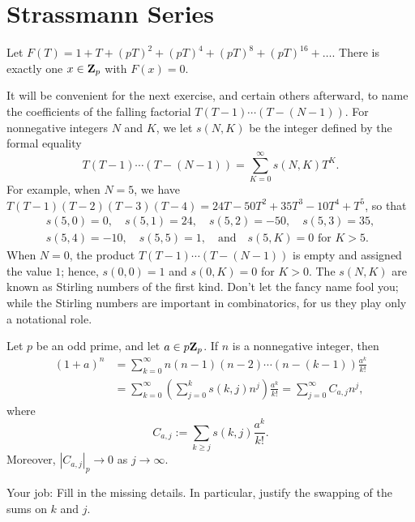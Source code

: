 \section*{Strassmann Series}

\begin{prob}\label{prob:uniquezero} Let $F(T) = 1 + T + (pT)^2 + (pT)^4 + (pT)^8 + (pT)^{16} + \dots$. There is exactly one $x\in \mathbf{Z}_p$ with $F(x)=0$.
\end{prob}

\vspace{-0.22in}
\testrule
It will be convenient for the next exercise, and certain others afterward, to name the coefficients of the \textsf{falling factorial} $T(T-1) \cdots (T-(N-1))$. For nonnegative integers $N$ and $K$, we let $s(N,K)$ be the integer defined by the formal equality \[ T(T-1)\cdots(T-(N-1)) = \sum_{K=0}^{\infty} s(N,K)  T^K.\]
For example, when $N=5$, we have $T(T-1)(T-2)(T-3)(T-4) = 24T - 50T^2 + 35T^3 - 10T^4 + T^5$, so that
\begin{multline*} s(5,0)=0, \quad s(5,1) = 24, \quad s(5,2) = -50, \quad s(5,3) = 35, \\ s(5,4)=-10, \quad s(5,5) = 1, \quad\text{and}\quad s(5,K) = 0 \text{ for $K > 5$}.\end{multline*}
When $N=0$, the product $T(T-1)\cdots (T-(N-1))$ is empty and assigned  the value $1$; hence, $s(0,0)=1$ and $s(0,K)=0$ for $K>0$. The $s(N,K)$ are known as \textsf{Stirling numbers of the first kind}.  Don't let the fancy name fool you; while the Stirling numbers are important in combinatorics, for us they play only a notational role.
\testruletwo

\begin{prob}\label{ex:binomialseries}\label{prob:binomialseries}
Let $p$ be an odd prime, and let $a \in p\mathbf{Z}_p$. If $n$ is a nonnegative integer, then 
\begin{align*} (1+a)^{n} &= \sum_{k=0}^{\infty} n(n-1)(n-2)\cdots(n-(k-1)) \frac{a^k}{k!} \\
&= \sum_{k=0}^{\infty} \left(\sum_{j=0}^{k} s(k,j)n^j\right)\frac{a^k}{k!} = \sum_{j=0}^{\infty} C_{a,j} n^j,\end{align*}
where
\[ C_{a,j} := \sum_{k\ge j} s(k,j) \frac{a^k}{k!}. \]
Moreover, $|C_{a,j}|_p \to 0$ as $j\to\infty$. 

{\scriptsize Your job: Fill in the missing details. In particular, justify the swapping of the sums on $k$ and $j$.}

\end{prob}

